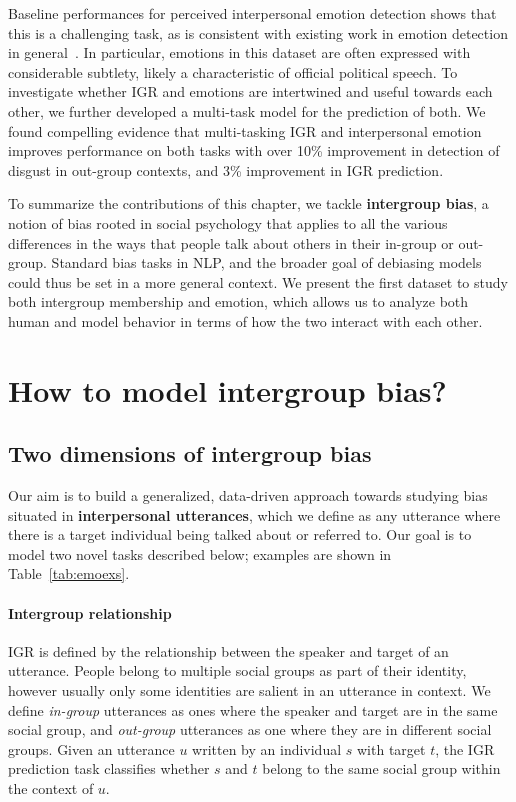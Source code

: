 Baseline performances for perceived interpersonal emotion detection shows that this is a challenging task, as is consistent with existing work in emotion detection in general~\cite{demszky-etal-2020-goemotions}. In particular, emotions in this dataset are often expressed with considerable subtlety, likely a characteristic of official political speech. To investigate whether IGR and emotions are intertwined and useful towards each other, we further developed a multi-task model for the prediction of both. We found compelling evidence that multi-tasking IGR and interpersonal emotion improves performance on both tasks with over 10\% improvement in detection of disgust in out-group contexts, and 3\% improvement in IGR prediction.

To summarize the contributions of this chapter, we tackle \textbf{intergroup bias}, a notion of bias rooted in social psychology that applies to all the various differences in the ways that people talk about others in their in-group or out-group. Standard bias tasks in NLP, and the broader goal of debiasing models could thus be set in a more general context. We present the first dataset to study both intergroup membership and emotion, which allows us to analyze both human and model behavior in terms of how the two interact with each other.

\section{How to model intergroup bias?}
\label{sec:twitter-howto}

\subsection{Two dimensions of intergroup bias}
\label{sec:twitter-dimensions}

Our aim is to build a generalized, data-driven approach towards studying bias situated in \textbf{interpersonal utterances}, which we define as any utterance where there is a target individual being talked about or referred to. Our goal is to model two novel tasks described below; examples are shown in Table~\ref{tab:emoexs}.

\paragraph{Intergroup relationship} IGR is defined by the relationship between the speaker and target of an utterance. People belong to multiple social groups as part of their identity, however usually only some identities are salient in an utterance in context. We define \emph{in-group} utterances as ones where the speaker and target are in the same social group, and \emph{out-group} utterances as one where they are in different social groups. Given an utterance $u$ written by an individual $s$ with target $t$, the IGR prediction task classifies whether $s$ and $t$ belong to the same social group within the context of $u$.

